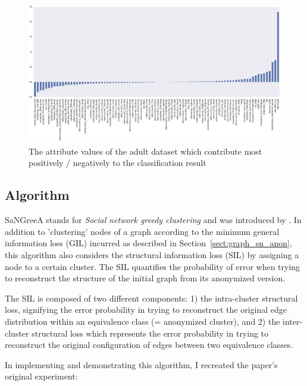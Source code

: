 \documentclass{llncs}
\begin{document}
\begin{figure}[H]
	\begin{center}
    	\hspace*{-1.5cm}
		\includegraphics[width=1.3\textwidth]{figures/experiment/important_columns}
		\caption{The attribute values of the adult dataset which contribute most positively / negatively to the classification result}
		\label{fig:adult_important_columns}
	\end{center}
\end{figure}


\subsection{Algorithm}
\label{ssect:algorithm}

SaNGreeA stands for \textit{Social network greedy clustering} and was introduced by \cite{campan2009data}. In addition to 'clustering' nodes of a graph according to the minimum general information loss (GIL) incurred as described in Section~\ref{sect:graph_sn_anon}, this algorithm also considers the structural information loss (SIL) by assigning a node to a certain cluster. The SIL quantifies the probability of error when trying to reconstruct the structure of the initial graph from its anonymized version.

The SIL is composed of two different components: 1) the intra-cluster structural loss, signifying the error probability in trying to reconstruct the original edge distribution within an equivalence class (= anonymized cluster), and 2) the inter-cluster structural loss which represents the error probability in trying to reconstruct the original configuration of edges between two equivalence classes.

In implementing and demonstrating this algorithm, I recreated the paper's original experiment:
\end{document}
